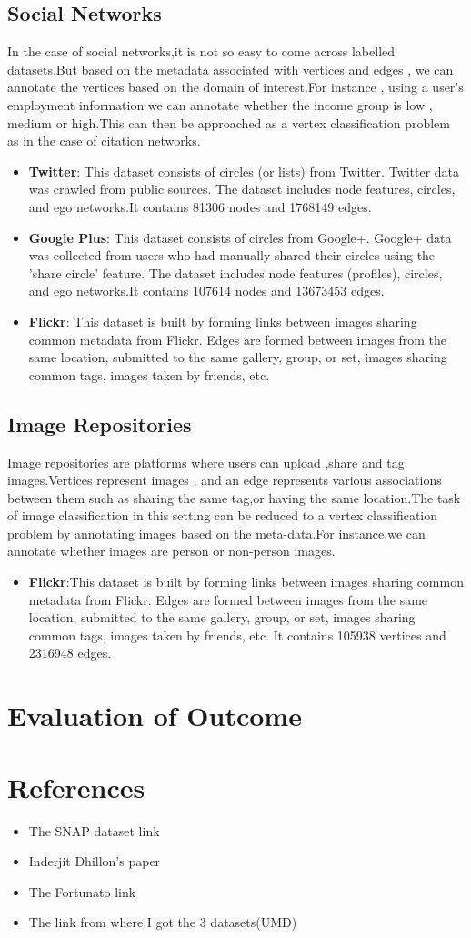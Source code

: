 \documentclass{article}
\begin{document}
\subsection*{Social Networks}
In the case of social networks,it is not so easy to come across labelled datasets.But based on the metadata associated with vertices and edges , we can annotate the vertices based on the domain of interest.For instance , using a user's employment information we can annotate whether the income group is low , medium or high.This can then be approached as a vertex classification problem as in the case of citation networks. 
\begin{itemize}
\item \textbf{Twitter}: This dataset consists of circles (or lists) from Twitter. Twitter data was crawled from public sources. The dataset includes node features, circles, and ego networks.It contains 81306 nodes and 1768149 edges.
\item \textbf{Google Plus}: This dataset consists of circles from Google+. Google+ data was collected from users who had manually shared their circles using the 'share circle' feature. The dataset includes node features (profiles), circles, and ego networks.It contains 107614 nodes and 13673453 edges.
\item \textbf{Flickr}: This dataset is built by forming links between images sharing common metadata from Flickr. Edges are formed between images from the same location, submitted to the same gallery, group, or set, images sharing common tags, images taken by friends, etc.
\end{itemize}
\subsection*{Image Repositories}
Image repositories are platforms where users can upload ,share and tag images.Vertices represent images , and an edge represents various associations between them such as sharing the same tag,or having the same location.The task of image classification in this setting can be reduced to a vertex classification problem by annotating images based on the meta-data.For instance,we can annotate whether images are person or non-person images. 
\begin{itemize}
\item \textbf{Flickr}:This dataset is built by forming links between images sharing common metadata from Flickr. Edges are formed between images from the same location, submitted to the same gallery, group, or set, images sharing common tags, images taken by friends, etc.
It contains 105938 vertices and 2316948 edges.
\end{itemize}  
\section*{Evaluation of Outcome}
 

\section*{References}
\begin{itemize}
\item The SNAP dataset link
\item Inderjit Dhillon's paper
\item The Fortunato link 
\item The link from where I got the 3 datasets(UMD)

\end{itemize}
\end{document}
